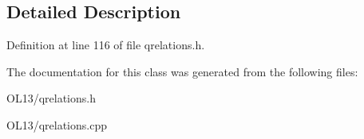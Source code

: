 \subsection{Detailed Description}


Definition at line 116 of file qrelations.\+h.



The documentation for this class was generated from the following files\+:\begin{DoxyCompactItemize}
\item 
O\+L13/qrelations.\+h\item 
O\+L13/qrelations.\+cpp\end{DoxyCompactItemize}
